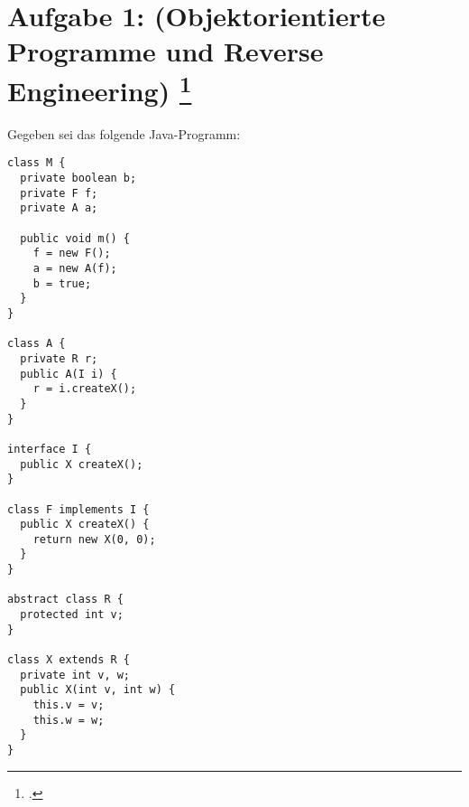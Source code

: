 \documentclass{lehramt-informatik-aufgabe}
\begin{document}
\section{Aufgabe 1: (Objektorientierte Programme und Reverse Engineering)
\footcite[Seite 15-16]{examen:66116:2018:03}}

Gegeben sei das folgende Java-Programm:

\begin{verbatim}
class M {
  private boolean b;
  private F f;
  private A a;

  public void m() {
    f = new F();
    a = new A(f);
    b = true;
  }
}

class A {
  private R r;
  public A(I i) {
    r = i.createX();
  }
}

interface I {
  public X createX();
}

class F implements I {
  public X createX() {
    return new X(0, 0);
  }
}

abstract class R {
  protected int v;
}

class X extends R {
  private int v, w;
  public X(int v, int w) {
    this.v = v;
    this.w = w;
  }
}
\end{verbatim}
\end{document}
